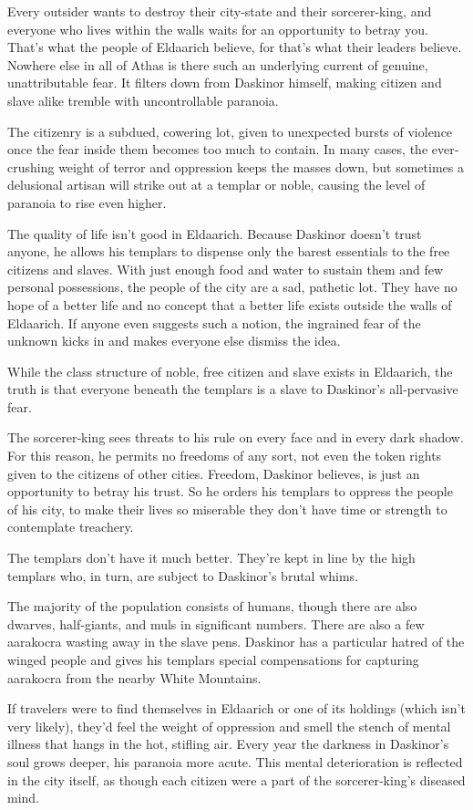 {
	Every outsider wants to destroy their city‐state and their sorcerer‐king, and everyone who lives within the walls waits for an opportunity to betray you. That's what the people of Eldaarich believe, for that's what their leaders believe. Nowhere else in all of Athas is there such an underlying current of genuine, unattributable fear. It filters down from Daskinor himself, making citizen and slave alike tremble with uncontrollable paranoia.

	The citizenry is a subdued, cowering lot, given to unexpected bursts of violence once the fear inside them becomes too much to contain. In many cases, the ever‐crushing weight of terror and oppression keeps the masses down, but sometimes a delusional artisan will strike out at a templar or noble, causing the level of paranoia to rise even higher.

	The quality of life isn't good in Eldaarich. Because Daskinor doesn't trust anyone, he allows his templars to dispense only the barest essentials to the free citizens and slaves. With just enough food and water to sustain them and few personal possessions, the people of the city are a sad, pathetic lot. They have no hope of a better life and no concept that a better life exists outside the walls of Eldaarich. If anyone even suggests such a notion, the ingrained fear of the unknown kicks in and makes everyone else dismiss the idea.

	While the class structure of noble, free citizen and slave exists in Eldaarich, the truth is that everyone beneath the templars is a slave to Daskinor's all‐pervasive fear.

	The sorcerer‐king sees threats to his rule on every face and in every dark shadow. For this reason, he permits no freedoms of any sort, not even the token rights given to the citizens of other cities. Freedom, Daskinor believes, is just an opportunity to betray his trust. So he orders his templars to oppress the people of his city, to make their lives so miserable they don't have time or strength to contemplate treachery.

	The templars don't have it much better. They're kept in line by the high templars who, in turn, are subject to Daskinor's brutal whims.

	The majority of the population consists of humans, though there are also dwarves, half‐giants, and muls in significant numbers. There are also a few aarakocra wasting away in the slave pens. Daskinor has a particular hatred of the winged people and gives his templars special compensations for capturing aarakocra from the nearby White Mountains.

	If travelers were to find themselves in Eldaarich or one of its holdings (which isn't very likely), they'd feel the weight of oppression and smell the stench of mental illness that hangs in the hot, stifling air. Every year the darkness in Daskinor's soul grows deeper, his paranoia more acute. This mental deterioration is reflected in the city itself, as though each citizen were a part of the sorcerer‐king's diseased mind.
}
